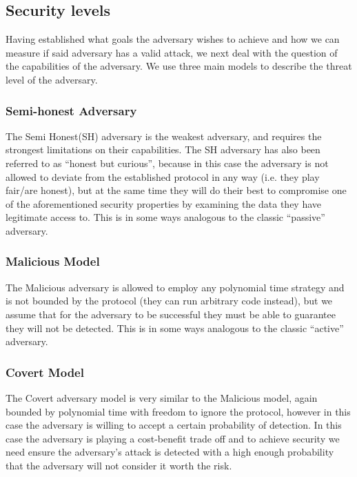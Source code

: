 \documentclass[a4paper,10pt]{article}
\begin{document}
		\subsection{Security levels}\label{sub:securityLevels}
			Having established what goals the adversary wishes to achieve and how we can measure if said adversary has a valid attack, we next deal with the question of the capabilities of the adversary. We use three main models to describe the threat level of the adversary.\\

			\subsubsection{Semi-honest Adversary}
				The Semi Honest(SH) adversary is the weakest adversary, and requires the strongest limitations on their capabilities. The SH adversary has also been referred to as ``honest but curious'', because in this case the adversary is not allowed to deviate from the established protocol in any way (i.e. they play fair/are honest), but at the same time they will do their best to compromise one of the aforementioned security properties by examining the data they have legitimate access to. This is in some ways analogous to the classic ``passive'' adversary.

			\subsubsection{Malicious Model}
				The Malicious adversary is allowed to employ any polynomial time strategy and is not bounded by the protocol (they can run arbitrary code instead), but we assume that for the adversary to be successful they must be able to guarantee they will not be detected. This is in some ways analogous to the classic ``active'' adversary.

			\subsubsection{Covert Model}
				The Covert adversary model is very similar to the Malicious model, again bounded by polynomial time with freedom to ignore the protocol, however in this case the adversary is willing to accept a certain probability of detection. In this case the adversary is playing a cost-benefit trade off and to achieve security we need ensure the adversary's attack is detected with a high enough probability that the adversary will not consider it worth the risk.\\
\end{document}
